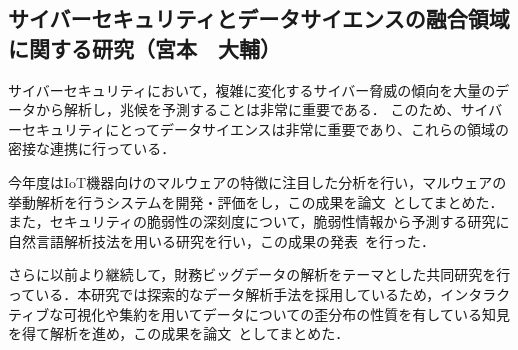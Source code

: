\subsection{サイバーセキュリティとデータサイエンスの融合領域に関する研究（宮本　大輔）}

サイバーセキュリティにおいて，複雑に変化するサイバー脅威の傾向を大量のデータから解析し，兆候を予測することは非常に重要である．
このため、サイバーセキュリティにとってデータサイエンスは非常に重要であり、これらの領域の密接な連携に行っている．

今年度はIoT機器向けのマルウェアの特徴に注目した分析を行い，マルウェアの挙動解析を行うシステムを開発・評価をし，この成果を論文~\cite{dmiya2}としてまとめた．また，セキュリティの脆弱性の深刻度について，脆弱性情報から予測する研究に自然言語解析技法を用いる研究を行い，この成果の発表~\cite{dmiya3}を行った．

さらに以前より継続して，財務ビッグデータの解析をテーマとした共同研究を行っている．本研究では探索的なデータ解析手法を採用しているため，インタラクティブな可視化や集約を用いてデータについての歪分布の性質を有している知見を得て解析を進め，この成果を論文~\cite{dmiya1}としてまとめた．



